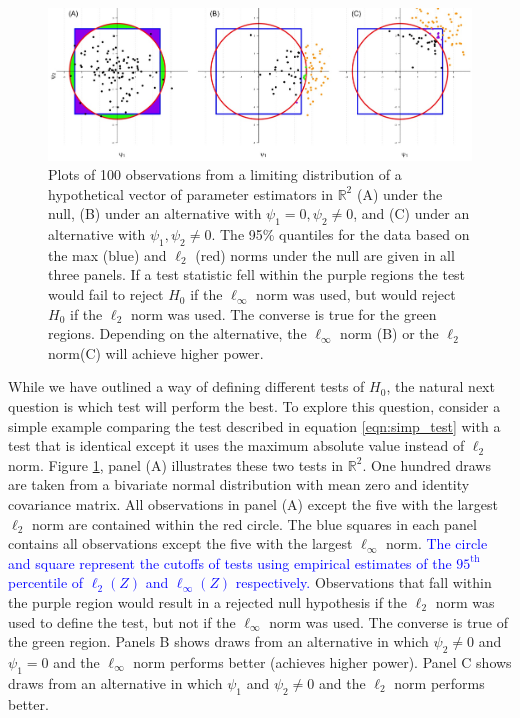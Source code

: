 \documentclass{article}
\begin{document}
\begin{figure}
	\centering
	\includegraphics[width = \linewidth]{figure_code/pwr_cmp.jpeg}
	\caption{Plots of 100 observations from a limiting distribution of a hypothetical vector of parameter estimators in $\mathbb{R}^2$ (A) under the null, (B) under an alternative with $\psi_1 = 0, \psi_2 \neq 0$, and (C) under an alternative with $\psi_1, \psi_2 \neq 0$. The 95\% quantiles for the data based on the max (blue) and $\ell_2$ (red) norms under the null are given in all three panels. If a test statistic fell within the purple regions the test would fail to reject $H_0$ if the $\ell_\infty$ norm was used, but would reject $H_0$ if the $\ell_2$ norm was used.  The converse is true for the green regions.  Depending on the alternative, the $\ell_\infty$ norm (B) or the $\ell_2$ norm(C) will achieve higher power.}
	\label{fig:figure1}
\end{figure}

While we have outlined a way of defining different tests of $H_0$, the natural next question is which test will perform the best.  To explore this question, consider a simple example comparing the test described in equation \eqref{eqn:simp_test} with a test that is identical except it uses the maximum absolute value instead of $\ell_2$ norm.  Figure \ref{fig:figure1}, panel (A) illustrates these two tests in $\mathbb{R}^2$. One hundred draws are taken from a bivariate normal distribution with mean zero and identity covariance matrix. All observations in panel (A) except the five with the largest $\ell_2$ norm are contained within the red circle. The blue squares in each panel contains all observations except the five with the largest $\ell_\infty$ norm. 
\textcolor{blue}{The circle and square represent the cutoffs of tests using empirical estimates of the $95^{\text{th}}$ percentile of $\ell_2(Z)$ and $\ell_\infty(Z)$ respectively.}
Observations that fall within the purple region would result in a rejected null hypothesis if the $\ell_2$ norm was used to define the test, but not if the $\ell_\infty$ norm was used. The converse is true of the green region. Panels B shows draws from an alternative in which $\psi_2 \ne 0$ and $\psi_1 = 0$ and the $\ell_\infty$ norm performs better (achieves higher power). Panel C shows draws from an alternative in which $\psi_1$ and $\psi_2 \neq 0$ and the $\ell_2$ norm performs better. 
\end{document}
